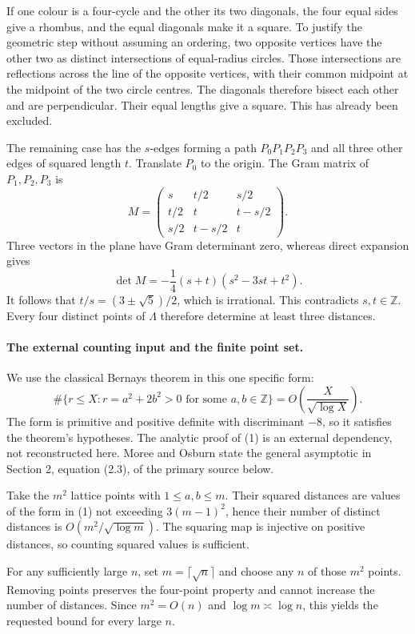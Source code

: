 If one colour is a four-cycle and the other its two diagonals, the four equal sides give a rhombus, and the equal diagonals make it a square. To justify the geometric step without assuming an ordering, two opposite vertices have the other two as distinct intersections of equal-radius circles. Those intersections are reflections across the line of the opposite vertices, with their common midpoint at the midpoint of the two circle centres. The diagonals therefore bisect each other and are perpendicular. Their equal lengths give a square. This has already been excluded.

The remaining case has the \(s\)-edges forming a path \(P_0P_1P_2P_3\) and all three other edges of squared length \(t\). Translate \(P_0\) to the origin. The Gram matrix of \(P_1,P_2,P_3\) is
\[
 M=\begin{pmatrix}
 s&t/2&s/2\\
 t/2&t&t-s/2\\
 s/2&t-s/2&t
 \end{pmatrix}.
\]
Three vectors in the plane have Gram determinant zero, whereas direct expansion gives
\[
 \det M=-\frac14(s+t)(s^2-3st+t^2).
\]
It follows that \(t/s=(3\pm\sqrt5)/2\), which is irrational. This contradicts \(s,t\in\mathbb Z\). Every four distinct points of \(\Lambda\) therefore determine at least three distances.

\paragraph{The external counting input and the finite point set.}
We use the classical Bernays theorem in this one specific form:
\[
 \#\{r\leq X:r=a^2+2b^2>0\text{ for some }a,b\in\mathbb Z\}
 =O\left(\frac X{\sqrt{\log X}}\right). \tag{1}
\]
The form is primitive and positive definite with discriminant \(-8\), so it satisfies the theorem's hypotheses. The analytic proof of (1) is an external dependency, not reconstructed here. Moree and Osburn state the general asymptotic in Section 2, equation (2.3), of the primary source below.

Take the \(m^2\) lattice points with \(1\leq a,b\leq m\). Their squared distances are values of the form in (1) not exceeding \(3(m-1)^2\), hence their number of distinct distances is \(O(m^2/\sqrt{\log m})\). The squaring map is injective on positive distances, so counting squared values is sufficient.

For any sufficiently large \(n\), set \(m=\lceil\sqrt n\rceil\) and choose any \(n\) of those \(m^2\) points. Removing points preserves the four-point property and cannot increase the number of distances. Since \(m^2=O(n)\) and \(\log m\asymp\log n\), this yields the requested bound for every large \(n\).

